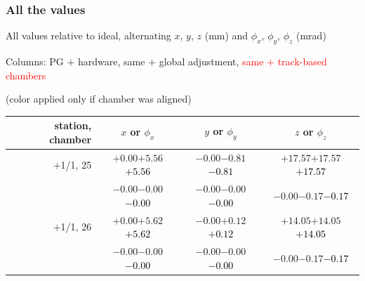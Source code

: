 \documentclass[compress]{beamer}
\begin{document}
\begin{frame}
\frametitle{All the values}
\tiny

All values relative to ideal, alternating $x$, $y$, $z$ (mm) and $\phi_x$, $\phi_y$, $\phi_z$ (mrad)

Columns: PG $+$ hardware, same $+$ global adjustment, \textcolor{red}{same $+$ track-based chambers}

\hfill (color applied only if chamber was aligned)

\vfill
\renewcommand{\arraystretch}{1.1}
\begin{tabular}{r | c | c | c}
station, chamber & $x$ or $\phi_x$ & $y$ or $\phi_y$ & $z$ or $\phi_z$ \\\hline
$+$1/1, 25 & $+0.00$\hspace{0.1 cm}$+5.56$\hspace{0.1 cm}\textcolor{black}{$+5.56$} & $-0.00$\hspace{0.1 cm}$-0.81$\hspace{0.1 cm}\textcolor{black}{$-0.81$} & $+17.57$\hspace{0.1 cm}$+17.57$\hspace{0.1 cm}\textcolor{black}{$+17.57$} \\
           & $-0.00$\hspace{0.1 cm}$-0.00$\hspace{0.1 cm}\textcolor{black}{$-0.00$} & $-0.00$\hspace{0.1 cm}$-0.00$\hspace{0.1 cm}\textcolor{black}{$-0.00$} & $-0.00$\hspace{0.1 cm}$-0.17$\hspace{0.1 cm}\textcolor{black}{$-0.17$} \\
$+$1/1, 26 & $+0.00$\hspace{0.1 cm}$+5.62$\hspace{0.1 cm}\textcolor{black}{$+5.62$} & $-0.00$\hspace{0.1 cm}$+0.12$\hspace{0.1 cm}\textcolor{black}{$+0.12$} & $+14.05$\hspace{0.1 cm}$+14.05$\hspace{0.1 cm}\textcolor{black}{$+14.05$} \\
           & $-0.00$\hspace{0.1 cm}$-0.00$\hspace{0.1 cm}\textcolor{black}{$-0.00$} & $-0.00$\hspace{0.1 cm}$-0.00$\hspace{0.1 cm}\textcolor{black}{$-0.00$} & $-0.00$\hspace{0.1 cm}$-0.17$\hspace{0.1 cm}\textcolor{black}{$-0.17$} \\

\end{tabular}
\end{frame}
\end{document}
